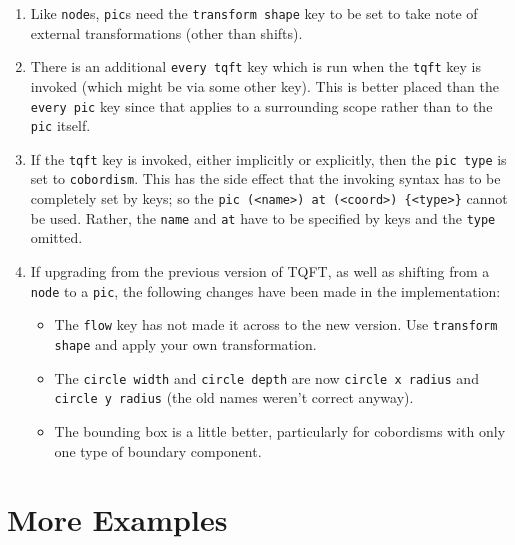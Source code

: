 \documentclass{ltxdoc}
\begin{document}
\begin{enumerate}
\item Like \Verb+node+s, \Verb+pic+s need the \Verb+transform shape+ key to be set to take note of external transformations (other than shifts).
\item There is an additional \Verb+every tqft+ key which is run when the \Verb+tqft+ key is invoked (which might be via some other key).
This is better placed than the \Verb+every pic+ key since that applies to a surrounding scope rather than to the \Verb+pic+ itself.
\item If the \Verb+tqft+ key is invoked, either implicitly or explicitly, then the \Verb+pic type+ is set to \Verb+cobordism+.
This has the side effect that the invoking syntax has to be completely set by keys; so the \Verb+pic (<name>) at (<coord>) {<type>}+ cannot be used.
Rather, the \Verb+name+ and \Verb+at+ have to be specified by keys and the \Verb+type+ omitted.

\item If upgrading from the previous version of TQFT, as well as shifting from a \Verb+node+ to a \Verb+pic+, the following changes have been made in the implementation:

\begin{itemize}
\item The \Verb+flow+ key has not made it across to the new version.
Use \Verb+transform shape+ and apply your own transformation.

\item The \Verb+circle width+ and \Verb+circle depth+ are now \Verb+circle x radius+ and \Verb+circle y radius+ (the old names weren't correct anyway).

\item The bounding box is a little better, particularly for cobordisms with only one type of boundary component.
\end{itemize}
\end{enumerate}

\section{More Examples}
\end{document}
